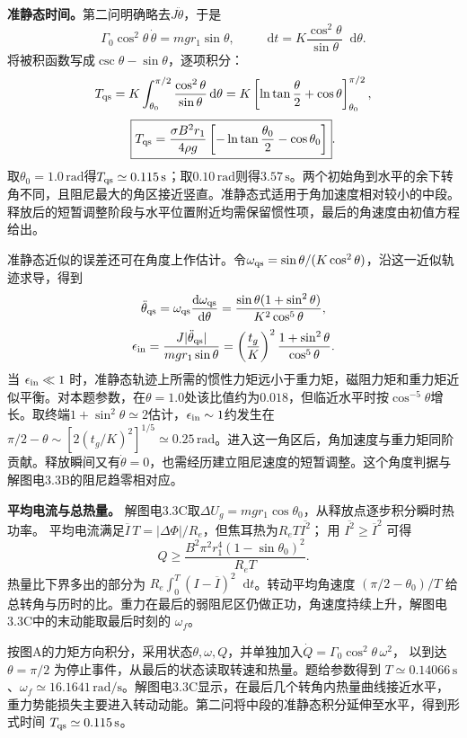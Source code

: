 \documentclass[UTF8,fontset=fandol,a4paper,11pt]{ctexart}
\newcommand{\dd}{\mathop{}\!\mathrm{d}}
\begin{document}
\textbf{准静态时间。}第二问明确略去$J\ddot\theta$，于是
\[
\Gamma_0\cos^2\theta\,\dot\theta=mg r_1\sin\theta,
\qquad \dd t=K\frac{\cos^2\theta}{\sin\theta}\dd\theta.
\]
将被积函数写成$\csc\theta-\sin\theta$，逐项积分：
\[
T_{\rm qs}=K\int_{\theta_0}^{\pi/2}\frac{\cos^2\theta}{\sin\theta}\dd\theta
=K\left[\ln\tan\frac\theta2+\cos\theta\right]_{\theta_0}^{\pi/2},
\]
\[
\boxed{T_{\rm qs}=\frac{\sigma B^2r_1}{4\rho g}
\left[-\ln\tan\frac{\theta_0}{2}-\cos\theta_0\right]}.
\]
取$\theta_0=1.0\,\mathrm{rad}$得$T_{\rm qs}\simeq0.115\,\mathrm s$；取$0.10\,\mathrm{rad}$则得$3.57\,\mathrm s$。两个初始角到水平的余下转角不同，且阻尼最大的角区接近竖直。准静态式适用于角加速度相对较小的中段。释放后的短暂调整阶段与水平位置附近均需保留惯性项，最后的角速度由初值方程给出。

准静态近似的误差还可在角度上作估计。令$\omega_{\rm qs}=\sin\theta/(K\cos^2\theta)$，沿这一近似轨迹求导，得到
\[
\ddot\theta_{\rm qs}=\omega_{\rm qs}\frac{\dd\omega_{\rm qs}}{\dd\theta}
=\frac{\sin\theta(1+\sin^2\theta)}{K^2\cos^5\theta},
\]
\[
\epsilon_{\rm in}=\frac{J|\ddot\theta_{\rm qs}|}{mg r_1\sin\theta}
=\left(\frac{t_g}{K}\right)^2\frac{1+\sin^2\theta}{\cos^5\theta}.
\]
当 $\epsilon_{\rm in}\ll1$ 时，准静态轨迹上所需的惯性力矩远小于重力矩，磁阻力矩和重力矩近似平衡。对本题参数，在$\theta=1.0$处该比值约为$0.018$，但临近水平时按$\cos^{-5}\theta$增长。取终端$1+\sin^2\theta\simeq2$估计，$\epsilon_{\rm in}\sim1$约发生在$\pi/2-\theta\sim[2(t_g/K)^2]^{1/5}\simeq0.25\,\mathrm{rad}$。进入这一角区后，角加速度与重力矩同阶贡献。释放瞬间又有$\dot\theta=0$，也需经历建立阻尼速度的短暂调整。这个角度判据与解图电3.3B的阻尼趋零相对应。


\textbf{平均电流与总热量。} 解图电3.3C取$\Delta U_g=mgr_1\cos\theta_0$，从释放点逐步积分瞬时热功率。
平均电流满足$\overline I\,T=|\Delta\Phi|/R_e$，但焦耳热为$R_eT\overline{I^2}$；
用 $\overline{I^2}\ge\overline I^2$ 可得
\[
Q\ge\frac{B^2\pi^2r_1^4(1-\sin\theta_0)^2}{R_eT}.
\]
热量比下界多出的部分为 $R_e\int_0^T(I-\overline I)^2\dd t$。转动平均角速度 $(\pi/2-\theta_0)/T$ 给总转角与历时的比。重力在最后的弱阻尼区仍做正功，角速度持续上升，解图电3.3C中的末动能取最后时刻的 $\omega_f$。

按图A的力矩方向积分，采用状态$\theta,\omega,Q$，并单独加入$\dot Q=\Gamma_0\cos^2\theta\,\omega^2$，
以到达 $\theta=\pi/2$ 为停止事件，从最后的状态读取转速和热量。题给参数得到 $T\simeq0.14066\,\mathrm s$、$\omega_f\simeq16.1641\,\mathrm{rad/s}$。解图电3.3C显示，在最后几个转角内热量曲线接近水平，重力势能损失主要进入转动动能。第二问将中段的准静态积分延伸至水平，得到形式时间 $T_{\rm qs}\simeq0.115\,\mathrm s$。
\end{document}
